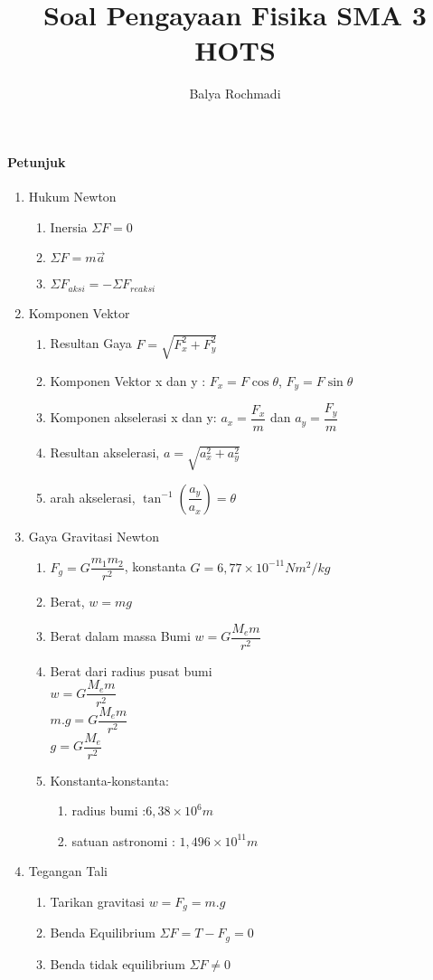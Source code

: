 \documentclass[12pt,a4paper,draft,final,oneside,twoside,openright,openany]{article}
\author{Balya Rochmadi}
\title{Soal Pengayaan Fisika SMA 3 HOTS}
\begin{document}
	\maketitle
	\noindent\makebox[\linewidth]{\rule{\paperwidth}{0.4pt}}
	\paragraph{Petunjuk}
	\begin{enumerate}
		\item Hukum Newton 
		\begin{enumerate}
			\item Inersia $\Sigma F=0$
			\item $\Sigma F=m\vec{a}$
			\item $\Sigma F_{aksi}=-\Sigma F_{reaksi}$
		\end{enumerate}
		\item Komponen Vektor 
		\begin{enumerate}
			\item Resultan Gaya $F=\sqrt{F_x^2+F_y^2}$
			\item Komponen Vektor x dan y : $F_x=F \cos{\theta}$, $F_y=F \sin{\theta}$
			\item Komponen akselerasi x dan y: $a_x=\dfrac{F_x}{m}$ dan $a_y=\dfrac{F_y}{m}$
			\item Resultan akselerasi, $a=\sqrt{a_x^2+a_y^2}$
			\item arah akselerasi, $\tan^{-1}(\dfrac{a_y}{a_x})=\theta$
		\end{enumerate}
		\item Gaya Gravitasi Newton
		\begin{enumerate}
			\item $F_g=G\dfrac{m_1m_2}{r^2}$, konstanta $G=6,77 \times 10^{-11}Nm^2/kg$
			\item Berat, $w=mg$
			\item Berat dalam massa Bumi $w=G\dfrac{M_em}{r^2}$
			\item Berat dari radius pusat bumi\\
		 	$w=G\dfrac{M_em}{r^2}$\\
			$m.g=G\dfrac{M_em}{r^2}$\\
			$g=G\dfrac{M_e}{r^2}$
			\item Konstanta-konstanta:\\
			\begin{enumerate}
				\item radius bumi :$6,38\times10^6 m$
				\item satuan astronomi : $1,496\times10^11 m$
			\end{enumerate}
		\end{enumerate}
		\item Tegangan Tali
		\begin{enumerate}
			\item Tarikan gravitasi $w=F_g=m.g$
			\item Benda Equilibrium $\Sigma F=T-F_g=0$
			\item Benda tidak equilibrium $\Sigma F\neq 0$
		\end{enumerate}
	\end{enumerate}
\end{document}
